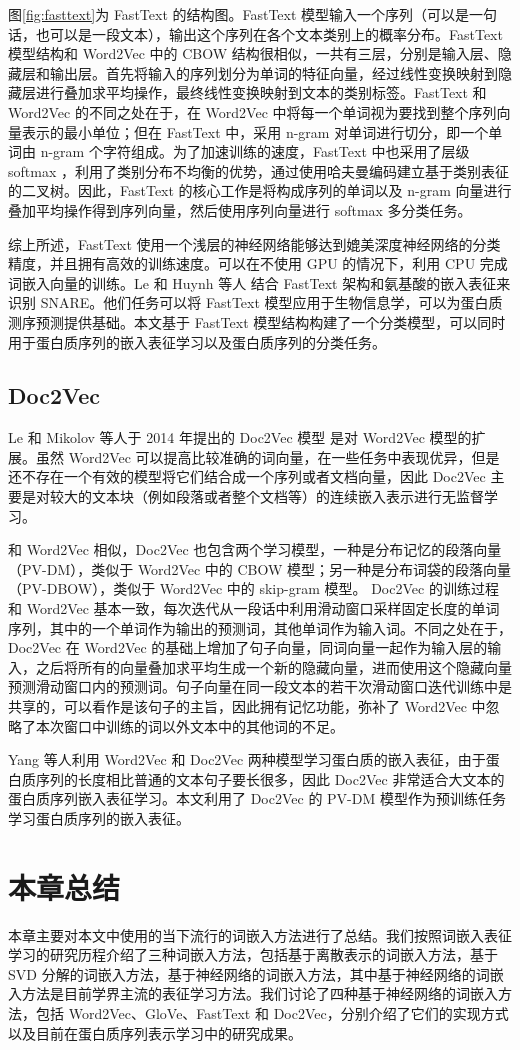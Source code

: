 图\ref{fig:fasttext}为 FastText 的结构图。FastText 模型输入一个序列（可以是一句话，也可以是一段文本），输出这个序列在各个文本类别上的概率分布。FastText 模型结构和 Word2Vec 中的 CBOW 结构很相似，一共有三层，分别是输入层、隐藏层和输出层。首先将输入的序列划分为单词的特征向量，经过线性变换映射到隐藏层进行叠加求平均操作，最终线性变换映射到文本的类别标签。FastText 和 Word2Vec 的不同之处在于，在 Word2Vec 中将每一个单词视为要找到整个序列向量表示的最小单位；但在 FastText 中，采用 n-gram 对单词进行切分，即一个单词由 n-gram 个字符组成。为了加速训练的速度，FastText 中也采用了层级 softmax ，利用了类别分布不均衡的优势，通过使用哈夫曼编码建立基于类别表征的二叉树。因此，FastText 的核心工作是将构成序列的单词以及 n-gram 向量进行叠加平均操作得到序列向量，然后使用序列向量进行 softmax 多分类任务。

综上所述，FastText 使用一个浅层的神经网络能够达到媲美深度神经网络的分类精度，并且拥有高效的训练速度。可以在不使用 GPU 的情况下，利用 CPU 完成词嵌入向量的训练。Le 和 Huynh 等人\cite{le2019identifying} 结合 FastText 架构和氨基酸的嵌入表征来识别 SNARE。他们任务可以将 FastText 模型应用于生物信息学，可以为蛋白质测序预测提供基础。本文基于 FastText 模型结构构建了一个分类模型，可以同时用于蛋白质序列的嵌入表征学习以及蛋白质序列的分类任务。

\subsection{Doc2Vec}
Le 和 Mikolov 等人于 2014 年提出的 Doc2Vec 模型 \cite{le2014distributed} 是对 Word2Vec 模型的扩展。虽然 Word2Vec 可以提高比较准确的词向量，在一些任务中表现优异，但是还不存在一个有效的模型将它们结合成一个序列或者文档向量，因此 Doc2Vec 主要是对较大的文本块（例如段落或者整个文档等）的连续嵌入表示进行无监督学习。

和 Word2Vec 相似，Doc2Vec 也包含两个学习模型，一种是分布记忆的段落向量（PV-DM），类似于 Word2Vec 中的 CBOW 模型；另一种是分布词袋的段落向量（PV-DBOW），类似于 Word2Vec 中的 skip-gram 模型。
Doc2Vec 的训练过程和 Word2Vec 基本一致，每次迭代从一段话中利用滑动窗口采样固定长度的单词序列，其中的一个单词作为输出的预测词，其他单词作为输入词。不同之处在于，Doc2Vec 在 Word2Vec 的基础上增加了句子向量，同词向量一起作为输入层的输入，之后将所有的向量叠加求平均生成一个新的隐藏向量，进而使用这个隐藏向量预测滑动窗口内的预测词。句子向量在同一段文本的若干次滑动窗口迭代训练中是共享的，可以看作是该句子的主旨，因此拥有记忆功能，弥补了 Word2Vec 中忽略了本次窗口中训练的词以外文本中的其他词的不足。

Yang \cite{yang2018learned} 等人利用 Word2Vec 和 Doc2Vec 两种模型学习蛋白质的嵌入表征，由于蛋白质序列的长度相比普通的文本句子要长很多，因此 Doc2Vec 非常适合大文本的蛋白质序列嵌入表征学习。本文利用了 Doc2Vec 的 PV-DM 模型作为预训练任务学习蛋白质序列的嵌入表征。

\section{本章总结}
本章主要对本文中使用的当下流行的词嵌入方法进行了总结。我们按照词嵌入表征学习的研究历程介绍了三种词嵌入方法，包括基于离散表示的词嵌入方法，基于 SVD 分解的词嵌入方法，基于神经网络的词嵌入方法，其中基于神经网络的词嵌入方法是目前学界主流的表征学习方法。我们讨论了四种基于神经网络的词嵌入方法，包括 Word2Vec、GloVe、FastText 和 Doc2Vec，分别介绍了它们的实现方式以及目前在蛋白质序列表示学习中的研究成果。



